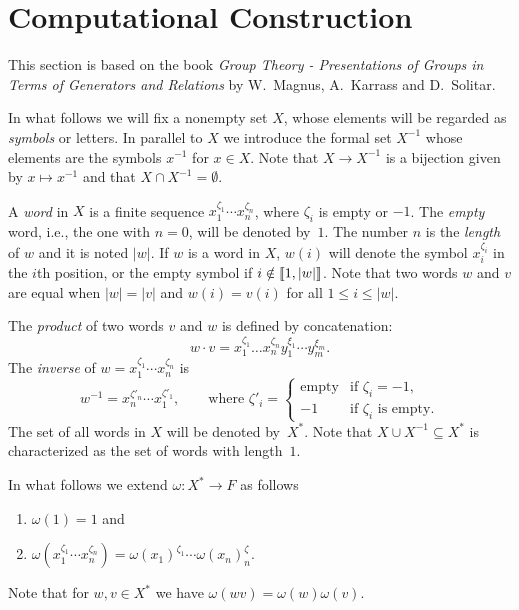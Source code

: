 \section{Computational Construction}
\setcounter{subsection}{1}

This section is based on the book \textit{Group Theory - Presentations of Groups in Terms of Generators and Relations\/} by W.~Magnus, A.~Karrass and D.~Solitar.

In what follows we will fix a nonempty set $X$, whose elements will be regarded as \textsl{symbols} or letters. In parallel to $X$ we introduce the formal set $X^{-1}$ whose elements are the symbols $x^{-1}$ for $x\in X$. Note that $X\to X^{-1}$ is a bijection given by $x\mapsto x^{-1}$ and that $X\cap X^{-1}=\emptyset$.

\begin{defns}\label{defns:words}
    A \textsl{word} in\/ $X$ is a finite sequence\/ $x_1^{\zeta_1}\cdots x_n^{\zeta_n}$, where\/ $\zeta_i$ is empty or\/ $-1$. The \textsl{empty} word, i.e., the one with\/ $n=0$, will be denoted by\/~$1$. The number $n$ is the \textsl{length} of $w$ and it is noted $|w|$. If $w$ is a word in $X$, $w(i)$ will denote the symbol $x_i^{\zeta_i}$ in the $i$th position, or the empty symbol if $i\notin\llbracket1,|w|\rrbracket$. Note that two words $w$ and $v$ are equal when $|w|=|v|$ and $w(i)=v(i)$ for all $1\le i\le|w|$.

    The \textsl{product} of two words $v$ and $w$ is defined by concatenation:
    $$
        w\cdot v=x_1^{\zeta_1}\dots x_n^{\zeta_n}
    y_1^{\xi_1}\cdots y_m^{\xi_m}.
    $$
    The \textsl{inverse} of $w=x_1^{\zeta_1}\cdots x_n^{\zeta_n}$ is
    $$
        w^{-1} = x_n^{\zeta'_n}\cdots x_1^{\zeta'_1},
        \qquad\text{where }\zeta'_i=\begin{cases}
                \text{empty}    &\text{if }\zeta_i=-1,\\
                -1 &\text{if $\zeta_i$ is empty}.
            \end{cases}
    $$
    The set of all words in $X$ will be denoted by~$X^*$. Note that $X\cup X^{-1}\subseteq X^*$ is characterized as the set of words with length~$1$.
\end{defns}

\begin{ntn}
    In what follows we extend $\omega\colon X^*\to F$ as follows
    \begin{enumerate}[-]
        \item $\omega(1)=1$ and
        \item $\omega(x_1^{\zeta_1}\cdots x_n^{\zeta_n})
            =\omega(x_1)^{\zeta_1}\cdots\omega(x_n)^\zeta_n$. 
    \end{enumerate}
    Note that for $w,v\in X^*$ we have $\omega(wv)=\omega(w)\omega(v)$.
\end{ntn}

